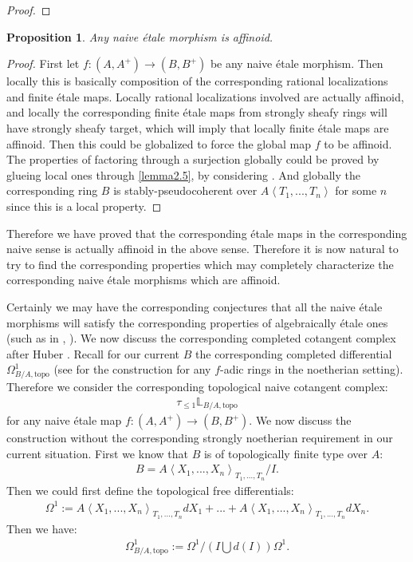 \documentclass[12pt]{amsart}
\newtheorem{proposition}[theorem]{Proposition}
\theoremstyle{definition}
\numberwithin{equation}{section}
\begin{document}
\begin{proof}
\end{proof}


\begin{proposition} \label{proposition2.5}
Any naive \'etale morphism is affinoid.
\end{proposition}

\begin{proof}
First let $f:(A,A^+)\rightarrow (B,B^+)$ be any naive \'etale morphism. Then locally this is basically composition of the corresponding rational localizations and finite \'etale maps. Locally rational localizations involved are actually affinoid, and locally the corresponding finite \'etale maps from strongly sheafy rings will have strongly sheafy target, which will imply that locally finite \'etale maps are affinoid. Then this could be globalized to force the global map $f$ to be affinoid. The properties of factoring through a surjection globally could be proved by glueing local ones through \cref{lemma2.5}, by considering \cite[Proposition 2.4.20]{KL1}. And globally the corresponding ring $B$ is stably-pseudocoherent over $A\left<T_1,...,T_n\right>$ for some $n$ since this is a local property. 
\end{proof}


\indent Therefore we have proved that the corresponding \'etale maps in the corresponding naive sense is actually affinoid in the above sense. Therefore it is now natural to try to find the corresponding properties which may completely characterize the corresponding naive \'etale morphisms which are affinoid.



\indent Certainly we may have the corresponding conjectures that all the naive \'etale morphisms will satisfy the corresponding properties of algebraically \'etale ones (such as in \cite[Chapitre 17]{EGAIV4}, \cite[Tag 00U1]{SP}). We now discuss the corresponding completed cotangent complex after Huber \cite[1.6.2]{Hu1}. Recall for our current $B$ the corresponding completed differential $\Omega^1_{B/A,\mathrm{topo}}$ (see \cite[1.6.2]{Hu1} for the construction for any $f$-adic rings in the noetherian setting). Therefore we consider the corresponding topological naive cotangent complex:
\begin{align}
\tau_{\leq 1}\mathbb{L}_{B/A,\mathrm{topo}}	
\end{align}
for any naive \'etale map $f:(A,A^+)\rightarrow (B,B^+)$. We now discuss the construction without the corresponding strongly noetherian requirement in our current situation. First we know that $B$ is of topologically finite type over $A$:
\begin{align}
B=A\left<X_1,...,X_n\right>_{T_1,...,T_n}/I.	
\end{align}
Then we could first define the topological free differentials:
\begin{align}
\Omega^1:=A\left<X_1,...,X_n\right>_{T_1,...,T_n}dX_1+...+A\left<X_1,...,X_n\right>_{T_1,...,T_n}dX_n.	
\end{align}
Then we have:
\begin{align}
\Omega^1_{B/A,\mathrm{topo}}:=	\Omega^1\slash (I\bigcup d(I))\Omega^1.
\end{align}
\end{document}

